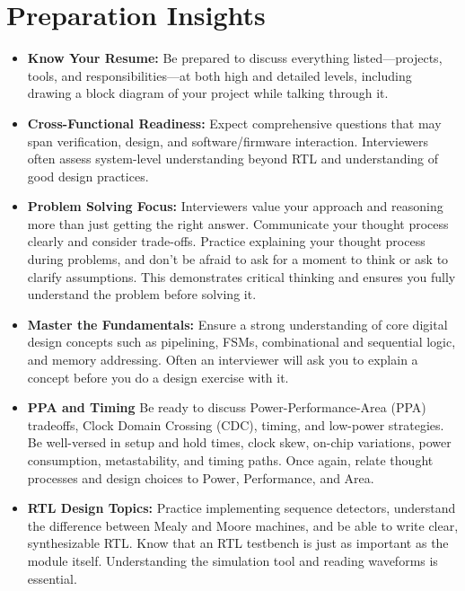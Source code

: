 \documentclass[11pt]{article}
\begin{document}
\section{Preparation Insights}
\begin{itemize}
    \item \textbf{Know Your Resume:} Be prepared to discuss everything
    listed—projects, tools, and responsibilities—at both high and detailed
    levels, including drawing a block diagram of your project while talking
    through it.

    \item \textbf{Cross-Functional Readiness:} Expect comprehensive questions
    that may span verification, design, and software/firmware interaction.
    Interviewers often assess system-level understanding beyond RTL and
    understanding of good design practices.

    \item \textbf{Problem Solving Focus:} Interviewers value your approach and
    reasoning more than just getting the right answer. Communicate your thought
    process clearly and consider trade-offs. Practice explaining your thought
    process during problems, and don't be afraid to ask for a moment to think
    or ask to clarify assumptions. This demonstrates critical thinking and ensures
    you fully understand the problem before solving it.

    \item \textbf{Master the Fundamentals:} Ensure a strong understanding of
    core digital design concepts such as pipelining, FSMs, combinational and
    sequential logic, and memory addressing. Often an interviewer will ask you
    to explain a concept before you do a design exercise with it.

    \item \textbf{PPA and Timing} Be ready to discuss Power-Performance-Area
    (PPA) tradeoffs, Clock Domain Crossing (CDC), timing, and low-power
    strategies. Be well-versed in setup and hold times, clock skew, on-chip
    variations, power consumption, metastability, and timing paths. Once again,
    relate thought processes and design choices to Power, Performance, and
    Area.

    \item \textbf{RTL Design Topics:} Practice implementing sequence detectors,
    understand the difference between Mealy and Moore machines, and be able to
    write clear, synthesizable RTL. Know that an RTL testbench is just as
    important as the module itself. Understanding the simulation tool and
    reading waveforms is essential.


\end{itemize}
\end{document}
